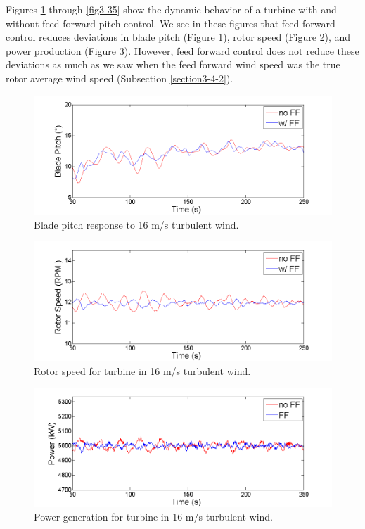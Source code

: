 Figures \ref{fig3-31} through \ref{fig3-35} show the dynamic behavior of a turbine with and without feed forward pitch control. We see in these figures that feed forward control reduces deviations in blade pitch (Figure \ref{fig3-31}), rotor speed (Figure \ref{fig3-32}), and power production (Figure \ref{fig3-33}). However, feed forward control does not reduce these deviations as much as we saw when the feed forward wind speed was the true rotor average wind speed (Subsection \ref{section3-4-2}). 

\begin{figure}[htbp]
	\centering
		\includegraphics[width = \linewidth]{Figures/ch3Figures/fig3-31.png}
		
	\caption{Blade pitch response to 16 m/s turbulent wind.}
	\label{fig3-31}
\end{figure}

\begin{figure}[htbp]
	\centering
		\includegraphics[width = \linewidth]{Figures/ch3Figures/fig3-32.png}
		
	\caption{Rotor speed for turbine in 16 m/s turbulent wind.}
	\label{fig3-32}
\end{figure}

\begin{figure}[htbp]
	\centering
		\includegraphics[width = \linewidth]{Figures/ch3Figures/fig3-33.png}
		
	\caption{Power generation for turbine in 16 m/s turbulent wind.}
	\label{fig3-33}
\end{figure}

